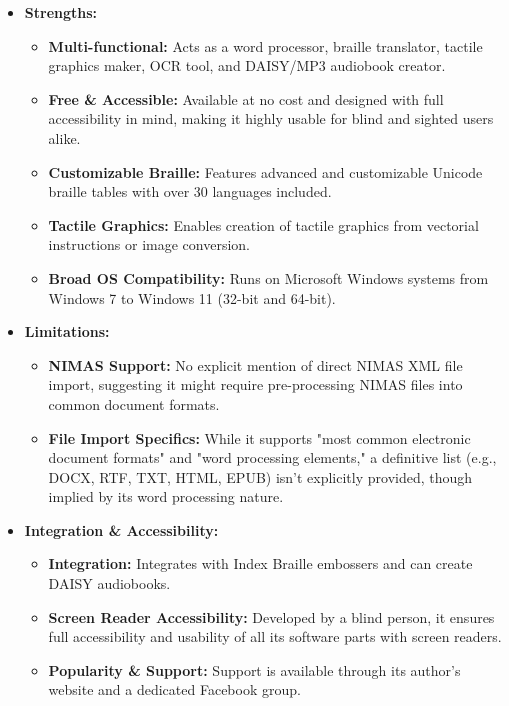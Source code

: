 \begin{itemize}
    \item \textbf{Strengths:}
    \begin{itemize}
        \item \textbf{Multi-functional:} Acts as a word processor, braille translator, tactile graphics maker, OCR tool, and DAISY/MP3 audiobook creator\footnotemark{}.
        \item \textbf{Free & Accessible:} Available at no cost and designed with full accessibility in mind, making it highly usable for blind and sighted users alike\footnotemark{}.
        \item \textbf{Customizable Braille:} Features advanced and customizable Unicode braille tables with over 30 languages included.
        \item \textbf{Tactile Graphics:} Enables creation of tactile graphics from vectorial instructions or image conversion.
        \item \textbf{Broad OS Compatibility:} Runs on Microsoft Windows systems from Windows 7 to Windows 11 (32-bit and 64-bit).
    \end{itemize}
    \item \textbf{Limitations:}
    \begin{itemize}
        \item \textbf{NIMAS Support:} No explicit mention of direct NIMAS XML file import, suggesting it might require pre-processing NIMAS files into common document formats.
        \item \textbf{File Import Specifics:} While it supports "most common electronic document formats" and "word processing elements," a definitive list (e.g., DOCX, RTF, TXT, HTML, EPUB) isn't explicitly provided, though implied by its word processing nature.
    \end{itemize}
    \item \textbf{Integration & Accessibility:}
    \begin{itemize}
        \item \textbf{Integration:} Integrates with Index Braille embossers and can create DAISY audiobooks.
        \item \textbf{Screen Reader Accessibility:} Developed by a blind person, it ensures full accessibility and usability of all its software parts with screen readers.
        \item \textbf{Popularity \& Support:} Support is available through its author's website and a dedicated Facebook group.
    \end{itemize}
\end{itemize}

